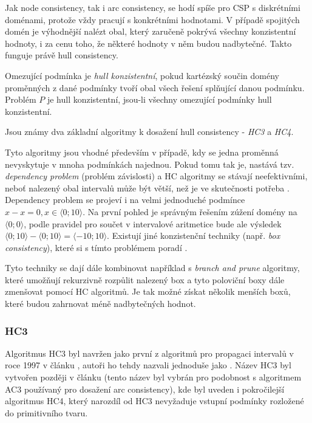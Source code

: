 Jak node consistency, tak i arc consistency, se hodí spíše pro CSP s diskrétními doménami, protože vždy pracují s konkrétními hodnotami. V případě spojitých domén je výhodnější nalézt obal, který zaručeně pokrývá všechny konzistentní hodnoty, i za cenu toho, že některé hodnoty v něm budou nadbytečné. Takto funguje právě hull consistency.

\begin{definition}
\label{def:hullConsistency}
Omezující podmínka je \emph{hull konzistentní}, pokud kartézský součin domény proměnných z dané podmínky tvoří obal všech řešení splňující danou podmínku. Problém $P$ je hull konzistentní, jsou-li všechny omezující podmínky hull konzistentní.
\end{definition}

Jsou známy dva základní algoritmy k dosažení hull consistency - \emph{HC3} a \emph{HC4}.

Tyto algoritmy jsou vhodné především v případě, kdy se jedna proměnná nevyskytuje v mnoha podmínkách najednou. Pokud tomu tak je, nastává tzv. \emph{dependency problem} (problém závislosti) a HC algoritmy se stávají neefektivními, neboť nalezený obal intervalů může být větší, než je ve skutečnosti potřeba \cite{BenhamouCLPIntervals}. Dependency problem se projeví i na velmi jednoduché podmínce $x - x = 0, x \in \langle 0;10 \rangle$. Na první pohled je správným řešením zúžení domény na $\langle 0;0\rangle$, podle pravidel pro součet v intervalové aritmetice bude ale výsledek $\langle 0;10 \rangle - \langle 0;10\rangle = \langle -10; 10 \rangle$. Existují jiné konzistenční techniky (např. \emph{box consistency}), které si s tímto problémem poradí \cite{rueherDependency}.

Tyto techniky se dají dále kombinovat například s \emph{branch and prune} algoritmy, které umožňují rekurzivně rozpůlit nalezený box a tyto poloviční boxy dále zmenšovat pomocí HC algoritmů. Je tak možné získat několik menších boxů, které budou zahrnovat méně nadbytečných hodnot.

\subsubsection{HC3}
Algoritmus HC3 byl navržen jako první z algoritmů pro propagaci intervalů v roce 1997 v článku \cite{Benhamou97applyinginterval}, autoři ho tehdy nazvali jednoduše jako . Název HC3 byl vytvořen později v článku \cite{Benhamou99revisinghull} (tento název byl vybrán pro podobnost s algoritmem AC3 používaný pro dosažení arc consistency), kde byl uveden i pokročilejší algoritmus HC4, který narozdíl od HC3 nevyžaduje vstupní podmínky rozložené do primitivního tvaru.
 

